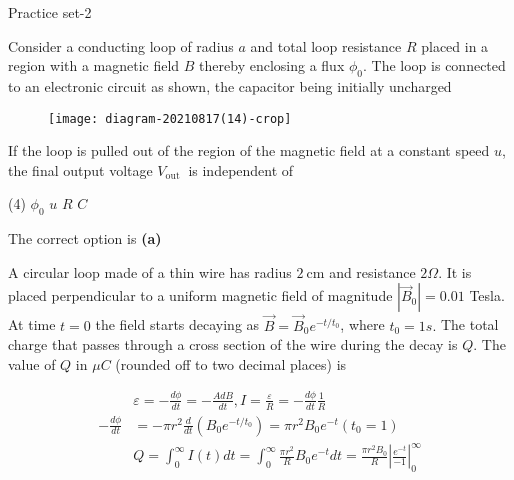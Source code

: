 \newpage
\begin{abox}
	Practice set-2 
\end{abox}
\begin{enumerate}
	\begin{minipage}{\textwidth}
		\item Consider a conducting loop of radius $a$ and total loop resistance $R$ placed in a region with a magnetic field $B$ thereby enclosing a flux $\phi_{0}$. The loop is connected to an electronic circuit as shown, the capacitor being initially uncharged\\
		\begin{figure}[H]
			\centering
			\texttt{[image: diagram-20210817(14)-crop]}
		\end{figure}
		If the loop is pulled out of the region of the magnetic field at a constant speed $u$, the final output voltage $V_{\text {out }}$ is independent of
	\end{minipage}
	\begin{tasks}(4)
		\task[\textbf{A.}] $\phi_{0}$
		\task[\textbf{B.}]$u$ 
		\task[\textbf{C.}]$R$
		\task[\textbf{D.}] $C$ 
	\end{tasks}
	\begin{answer}
		The correct option is \textbf{(a)}	
	\end{answer}
	\begin{minipage}{\textwidth}
		\item A circular loop made of a thin wire has radius $2 \mathrm{~cm}$ and resistance $2 \Omega$. It is placed perpendicular to a uniform magnetic field of magnitude $\left|\vec{B}_{0}\right|=0.01$ Tesla. At time $t=0$ the field starts decaying as $\vec{B}=\vec{B}_{0} e^{-t / t_{0}}$, where $t_{0}=1 s .$ The total charge that passes through a cross section of the wire during the decay is $Q$. The value of $Q$ in $\mu C$ (rounded off to two decimal places) is
	\end{minipage}
	\begin{answer}
		\begin{align*}
		& \varepsilon=-\frac{d \phi}{d t}=-\frac{A d B}{d t}, I=\frac{\varepsilon}{R}=-\frac{d \phi}{d t} \frac{1}{R} \\
		-\frac{d \phi}{d t}&=-\pi r^{2} \frac{d}{d t}\left(B_{0} e^{-t / t_{0}}\right)=\pi r^{2} B_{0} e^{-t}\left(t_{0}=1\right) \\
		&Q=\int_{0}^{\infty} I(t) d t=\int_{0}^{\infty} \frac{\pi r^{2}}{R} B_{0} e^{-t} d t=\frac{\pi r^{2} B_{0}}{R}\left|\frac{e^{-t}}{-1}\right|_{0}^{\infty} \\

\end{align*}
\end{answer}
\end{enumerate}
